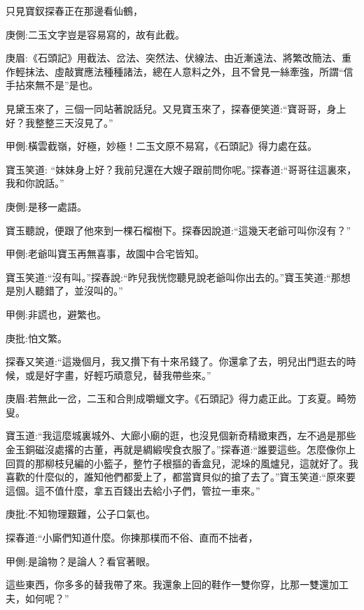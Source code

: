 \begin{parag}
    只見寶釵探春正在那邊看仙鶴，\begin{note}庚側:二玉文字豈是容易寫的，故有此截。\end{note}\begin{note}庚眉:《石頭記》用截法、岔法、突然法、伏線法、由近漸遠法、將繁改簡法、重作輕抹法、虛敲實應法種種諸法，總在人意料之外，且不曾見一絲牽強，所謂“信手拈來無不是”是也。\end{note}見黛玉來了，三個一同站著說話兒。又見寶玉來了，探春便笑道:“寶哥哥，身上好？我整整三天沒見了。”\begin{note}甲側:橫雲截嶺，好極，妙極！二玉文原不易寫，《石頭記》得力處在茲。\end{note}寶玉笑道: “妹妹身上好？我前兒還在大嫂子跟前問你呢。”探春道:“哥哥往這裏來，我和你說話。”\begin{note}庚側:是移一處語。\end{note}寶玉聽說，便跟了他來到一棵石榴樹下。探春因說道:“這幾天老爺可叫你沒有？”\begin{note}甲側:老爺叫寶玉再無喜事，故園中合宅皆知。\end{note}寶玉笑道:“沒有叫。”探春說:“昨兒我恍惚聽見說老爺叫你出去的。”寶玉笑道:“那想是別人聽錯了，並沒叫的。”\begin{note}甲側:非謊也，避繁也。\end{note}\begin{note}庚批:怕文繁。\end{note}探春又笑道:“這幾個月，我又攢下有十來吊錢了。你還拿了去，明兒出門逛去的時候，或是好字畫，好輕巧頑意兒，替我帶些來。”\begin{note}庚眉:若無此一岔，二玉和合則成嚼蠟文字。《石頭記》得力處正此。丁亥夏。畸笏叟。\end{note}寶玉道:“我這麼城裏城外、大廊小廟的逛，也沒見個新奇精緻東西，左不過是那些金玉銅磁沒處撂的古董，再就是綢緞喫食衣服了。”探春道:“誰要這些。怎麼像你上回買的那柳枝兒編的小籃子，整竹子根摳的香盒兒，泥垛的風爐兒，這就好了。我喜歡的什麼似的，誰知他們都愛上了，都當寶貝似的搶了去了。”寶玉笑道:“原來要這個。這不值什麼，拿五百錢出去給小子們，管拉一車來。”\begin{note}庚批:不知物理艱難，公子口氣也。\end{note}探春道:“小廝們知道什麼。你揀那樸而不俗、直而不拙者，\begin{note}甲側:是論物？是論人？看官著眼。\end{note}這些東西，你多多的替我帶了來。我還象上回的鞋作一雙你穿，比那一雙還加工夫，如何呢？”
\end{parag}


